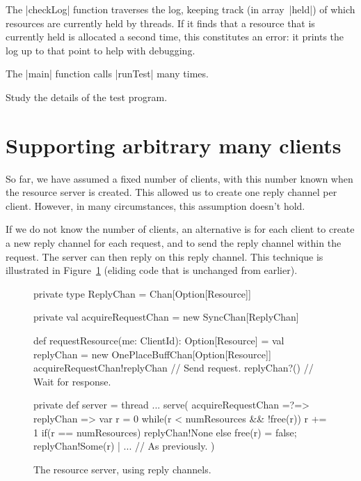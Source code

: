 The |checkLog| function traverses the log, keeping track (in array~|held|) of
which resources are currently held by threads.  If it finds that a resource
that is currently held is allocated a second time, this constitutes an error:
it prints the log up to that point to help with debugging.

The |main| function calls |runTest| many times. 

\begin{instruction}
Study the details of the test program.
\end{instruction}


\section{Supporting arbitrary many clients}

So far, we have assumed a fixed number of clients, with this number known when
the resource server is created.  This allowed us to create one reply channel
per client.  However, in many circumstances, this assumption doesn't hold.

If we do not know the number of clients, an alternative is for each client to
create a new reply channel for each request, and to send the reply channel
within the request.  The server can then reply on this reply channel.  
%
This technique is illustrated in Figure~\ref{fig:RAServer-replyChan} (eliding
code that is unchanged from earlier). 


\begin{figure}
\begin{scala}
  private type ReplyChan = Chan[Option[Resource]]

  private val acquireRequestChan = new SyncChan[ReplyChan]

  def requestResource(me: ClientId): Option[Resource] = {
    val replyChan = new OnePlaceBuffChan[Option[Resource]]
    acquireRequestChan!replyChan  // Send request.
    replyChan?() // Wait for response.
  }

  private def server = thread{
    ...
    serve(
      acquireRequestChan =?=> { replyChan => 
	var r = 0
	while(r < numResources && !free(r)) r += 1
	if(r == numResources) replyChan!None
        else{ free(r) = false; replyChan!Some(r) }
      }
      | ... // As previously. 
    )
  }
\end{scala}
\caption{The resource server, using reply channels.}
\label{fig:RAServer-replyChan}
\end{figure}

